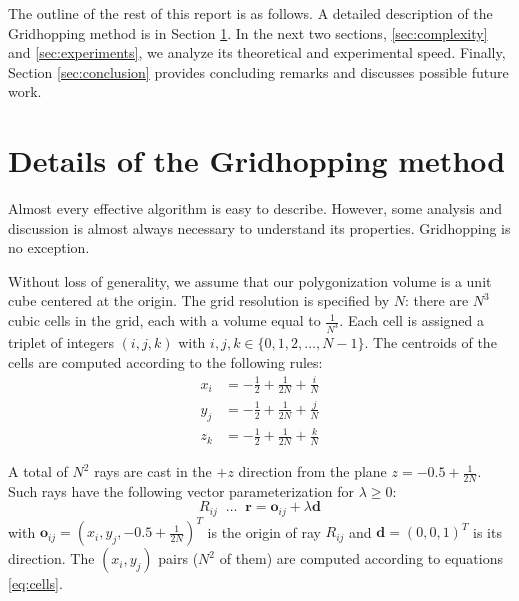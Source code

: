 \documentclass[11pt,twocolumn]{article}
\begin{document}
		The outline of the rest of this report is as follows.
		A detailed description of the Gridhopping method is in Section \ref{sec:ghop}.
		In the next two sections, \ref{sec:complexity} and \ref{sec:experiments}, we analyze its theoretical and experimental speed.
		Finally, Section \ref{sec:conclusion} provides concluding remarks and discusses possible future work.

	\section{Details of the Gridhopping method}\label{sec:ghop}
		Almost every effective algorithm is easy to describe.
		However, some analysis and discussion is almost always necessary to understand its properties.
		Gridhopping is no exception.

		Without loss of generality, we assume that our polygonization volume is a unit cube centered at the origin.
		The grid resolution is specified by $N$: there are $N^3$ cubic cells in the grid, each with a volume equal to $\frac{1}{N^3}$.
		Each cell is assigned a triplet of integers $(i, j, k)$ with $i, j, k\in \{0, 1, 2, \ldots, N-1\}$.
		The centroids of the cells are computed according to the following rules:
		\begin{align}\label{eq:cells}
			x_i &= -\frac{1}{2} + \frac{1}{2N} + \frac{i}{N}\nonumber\\
			y_j &= -\frac{1}{2} + \frac{1}{2N} + \frac{j}{N}\\
			z_k &= -\frac{1}{2} + \frac{1}{2N} + \frac{k}{N}\nonumber
		\end{align}

		A total of $N^2$ rays are cast in the $+z$ direction from the plane $z=-0.5+\frac{1}{2N}$.
		Such rays have the following vector parameterization for $\lambda \geq 0$:
		\begin{equation}
			R_{ij}\;\;\ldots\;\;\mathbf{r}=
			\mathbf{o}_{ij} + \lambda\mathbf{d}
		\end{equation}
		with $\mathbf{o}_{ij}=(x_i, y_j, -0.5+\frac{1}{2N})^T$ is the origin of ray $R_{ij}$ and $\mathbf{d}=(0, 0, 1)^T$ is its direction.
		The $(x_i, y_j)$ pairs ($N^2$ of them) are computed according to equations \eqref{eq:cells}.
\end{document}
